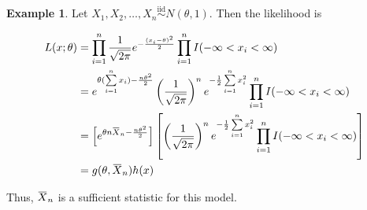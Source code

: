 \documentclass[12pt]{article}
\newcommand{\overbar}[1]{\mkern 1.5mu\overline{\mkern-1.5mu#1\mkern-1.5mu}\mkern 1.5mu}
\theoremstyle{definition}
\newtheorem*{example}{Example}
\begin{document}
\begin{example}
Let $X_1, X_2, \ldots, X_n \overset{\text{iid}}{\sim} N(\theta, 1)$. Then the 
likelihood is

\begin{align*}
L(x; \theta) &= \prod_{i = 1}^n \frac{1}{\sqrt{2 \pi}} e^{-\frac{(x_i - \theta)^2}{2}}
\prod_{i = 1}^n I(-\infty < x_i < \infty) \\
&= e^{\theta (\sum\limits_{i = 1}^n x_i) - \frac{n \theta^2}{2}} \left( \frac{1}{\sqrt{2\pi}} \right)^n
e^{-\frac{1}{2} \sum\limits_{i = 1}^n x_i^2} \prod_{i = 1}^n I(-\infty < x_i < \infty) \\
&= \left[ e^{\theta n \overbar{X}_n - \frac{n \theta^2}{2}} \right] \left[ \left( \frac{1}{\sqrt{2\pi}} \right)^n
e^{-\frac{1}{2} \sum\limits_{i = 1}^n x_i^2} \prod_{i = 1}^n I(-\infty < x_i < \infty) \right] \\
&= g(\theta, \overbar{X}_n)h(x)
\end{align*}

Thus, $\overbar{X}_n$ is a sufficient statistic for this model.

\end{example}
\end{document}
